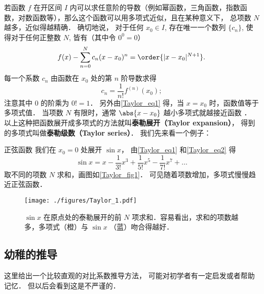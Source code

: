 

若函数 $f$ 在开区间 $I$ 内可以求任意阶的导数（例如幂函数，三角函数，指数函数，对数函数等），那么这个函数可以用多项式近似，且在某种意义下， 总项数 $N$ 越多，近似得越精确． 确切地说， 对于任何 $x_0\in I$, 存在唯一一个数列 $\{c_n\}$, 使得对于任何正整数 $N$, 皆有（其中令 $0^0 = 0$）
\begin{equation}\label{Taylor_eq1}
f(x) -\sum_{n = 0}^N  c_n (x - x_0)^n=\order{|x-x_0|^{N+1}}.
\end{equation}
每一个系数 $c_n$ 由函数在 $x_0$ 处的第 $n$ 阶导数求得
\begin{equation}\label{Taylor_eq2}
c_n = \frac{1}{n!} f^{(n)}(x_0);
\end{equation}
注意其中 0 的阶乘为 $0! = 1$． 另外由\autoref{Taylor_eq1} 得，当 $x=x_0$ 时，函数值等于多项式值． 当项数 $N$ 有限时，通常 $\abs{x-x_0}$ 越小多项式就越接近函数 ． 以上这种把函数展开成多项式的方法就叫\textbf{泰勒展开（Taylor expansion）}， 得到的多项式叫做\textbf{泰勒级数（Taylor series）}． 我们先来看一个例子：

\begin{example}{正弦函数}
我们在 $x_0=0$ 处展开 $\sin x$， 由\autoref{Taylor_eq1} 和\autoref{Taylor_eq2} 得
\begin{equation}\label{Taylor_eq3}
\sin x = x - \frac{1}{3!}{x^3} + \frac{1}{5!}{x^5} - \frac{1}{7!} x^7 + \ldots 
\end{equation}
取不同的项数 $N$ 求和，画图如\autoref{Taylor_fig1}． 可见随着项数增加，多项式慢慢趋近正弦函数．

\begin{figure}[ht]
\centering
\texttt{[image: ./figures/Taylor\_1.pdf]}
\caption{$\sin x$ 在原点处的泰勒展开的前 $N$ 项求和．容易看出，求和的项数越多，多项式（橙）与 $\sin x$ （蓝）吻合得越好．}\label{Taylor_fig1}
\end{figure}
\end{example}

\subsection{幼稚的推导}
这里给出一个比较直观的对比系数推导方法， 可能对初学者有一定启发或者帮助记忆． 但以后会看到这是不严谨的．

